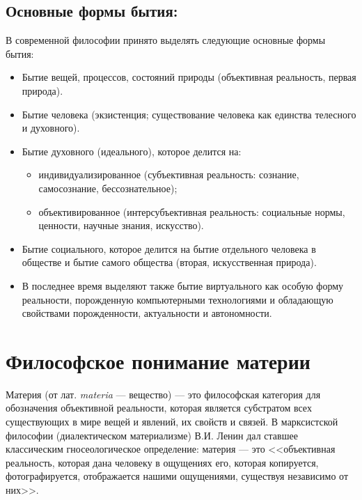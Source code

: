 \documentclass[12pt,a4paper]{article}
\begin{document}
	
	\subsection{Основные формы бытия:}
	В современной философии принято выделять следующие основные формы бытия:
	\begin{itemize}
		\item Бытие вещей, процессов, состояний природы (объективная реальность, первая природа).
		\item Бытие человека (экзистенция; существование человека как единства телесного и духовного).
		\item Бытие духовного (идеального), которое делится на:
		\begin{itemize}
			\item индивидуализированное (субъективная реальность: сознание, самосознание, бессознательное);
			\item объективированное (интерсубъективная реальность: социальные нормы, ценности, научные знания, искусство).
		\end{itemize}
		\item Бытие социального, которое делится на бытие отдельного человека в обществе и бытие самого общества (вторая, искусственная природа).
		\item В последнее время выделяют также бытие виртуального как особую форму реальности, порожденную компьютерными технологиями и обладающую свойствами порожденности, актуальности и автономности.
	\end{itemize}
	
	\section{Философское понимание материи~\checkmark}
	
	Материя (от лат. \textit{materia} — вещество) — это философская категория для обозначения объективной реальности, которая является субстратом всех существующих в мире вещей и явлений, их свойств и связей. В марксистской философии (диалектическом материализме) В.И. Ленин дал ставшее классическим гносеологическое определение: материя — это <<объективная реальность, которая дана человеку в ощущениях его, которая копируется, фотографируется, отображается нашими ощущениями, существуя независимо от них>>.
	
\end{document}
